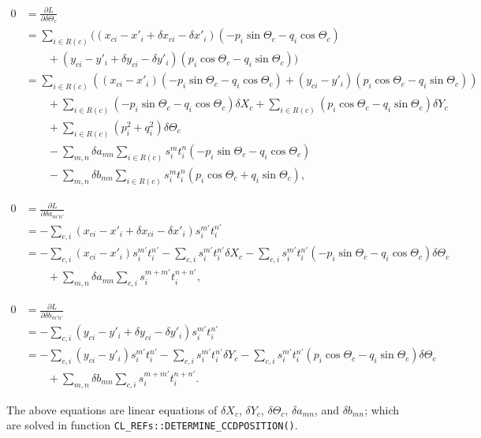 \documentclass{scrartcl}
\begin{document}
\begin{align}
    0
    &= \frac{\partial L}{\partial \delta \Theta_{c}}
\\  &= \sum_{i \in R(c)} \Big(
          \left( x_{ci} - x'_i + \delta x_{ci} - \delta x'_i \right) \left(-p_i \sin \Theta_c - q_i \cos \Theta_c \right)
            \nonumber \\ & \qquad
        + \left( y_{ci} - y'_i + \delta y_{ci} - \delta y'_i \right) \left( p_i \cos \Theta_c - q_i \sin \Theta_c \right)
        \Big)
\\  &= \sum_{i \in R(c)} \left(
            \left(x_{ci} - x'_i \right) \left(-p_i \sin \Theta_c - q_i \cos \Theta_c \right)
           +\left(y_{ci} - y'_i \right) \left( p_i \cos \Theta_c - q_i \sin \Theta_c \right)
        \right)
            \nonumber \\ & \qquad
        + \sum_{i \in R(c)} \left(-p_i \sin \Theta_c - q_i \cos \Theta_c \right) \delta X_{c}
        + \sum_{i \in R(c)} \left( p_i \cos \Theta_c - q_i \sin \Theta_c \right) \delta Y_{c}
            \nonumber \\ & \qquad
        + \sum_{i \in R(c)} \left(p_i^2 + q_i^2\right) \delta \Theta_c
            \nonumber \\ & \qquad
        - \sum_{m,n} \delta a_{mn} \sum_{i \in R(c)} s_i^{m} t_i^{n}
            \left(- p_i \sin \Theta_c - q_i \cos \Theta_c \right)
            \nonumber \\ & \qquad
        - \sum_{m,n} \delta b_{mn} \sum_{i \in R(c)} s_i^{m} t_i^{n}
            \left( p_i \cos \Theta_c + q_i \sin \Theta_c \right)
,
\end{align}

\begin{align}
    0
    &=\frac{\partial L}{\partial \delta a_{m'n'}}
\\  &= - \sum_{c,i} \left( x_{ci} - x'_i + \delta x_{ci} - \delta x'_i \right) s_i^{m'} t_i^{n'}
\\  &= - \sum_{c,i} (x_{ci} - x'_i) s_i^{m'} t_i^{n'}
        - \sum_{c,i} s_i^{m'} t_i^{n'} \delta X_{c}
        - \sum_{c,i} s_i^{m'} t_i^{n'} \left(-p_i \sin \Theta_c - q_i \cos \Theta_c \right) \delta \Theta_c
            \nonumber \\ & \qquad
        + \sum_{m,n} \delta a_{mn} \sum_{c,i} s_i^{m+m'} t_i^{n+n'}
,
\end{align}

\begin{align}
    0
    &=\frac{\partial L}{\partial \delta b_{m'n'}}
\\  &= - \sum_{c,i} \left( y_{ci} - y'_i + \delta y_{ci} - \delta y'_i \right) s_i^{m'} t_i^{n'}
\\  &= - \sum_{c,i} (y_{ci} - y'_i) s_i^{m'} t_i^{n'}
        - \sum_{c,i} s_i^{m'} t_i^{n'} \delta Y_{c}
        - \sum_{c,i} s_i^{m'} t_i^{n'} \left(p_i \cos \Theta_c - q_i \sin \Theta_c \right) \delta \Theta_c
            \nonumber \\ & \qquad
        + \sum_{m,n} \delta b_{mn} \sum_{c,i} s_i^{m+m'} t_i^{n+n'}
.
\end{align}

The above equations are linear equations of
$\delta X_c$, $\delta Y_c$, $\delta \Theta_c$, $\delta a_{mn}$, and $\delta b_{mn}$;
which are solved in function \texttt{CL\_REFs::DETERMINE\_CCDPOSITION()}.
\end{document}

